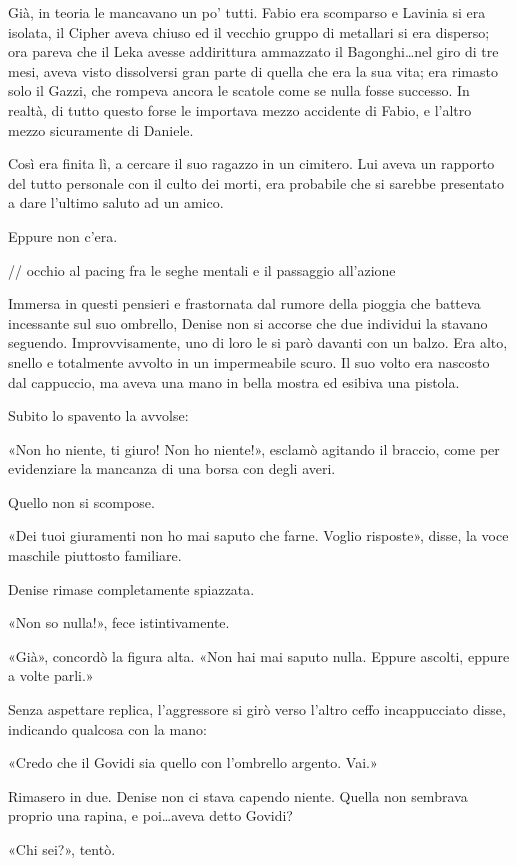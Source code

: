 Già, in teoria le mancavano un po' tutti. Fabio era scomparso e Lavinia si era isolata, il Cipher aveva chiuso ed il vecchio gruppo di metallari si era disperso; ora pareva che il Leka avesse addirittura ammazzato il Bagonghi\ldots nel giro di tre mesi, aveva visto dissolversi gran parte di quella che era la sua vita; era rimasto solo il Gazzi, che rompeva ancora le scatole come se nulla fosse successo. In realtà, di tutto questo forse le importava mezzo accidente di Fabio, e l'altro mezzo sicuramente di Daniele.

Così era finita lì, a cercare il suo ragazzo in un cimitero. Lui aveva un rapporto del tutto personale con il culto dei morti, era probabile che si sarebbe presentato a dare l'ultimo saluto ad un amico.

Eppure non c'era.

// occhio al pacing fra le seghe mentali e il passaggio all'azione

Immersa in questi pensieri e frastornata dal rumore della pioggia che batteva incessante sul suo ombrello, Denise non si accorse che due individui la stavano seguendo. Improvvisamente, uno di loro le si parò davanti con un balzo. Era alto, snello e totalmente avvolto in un impermeabile scuro. Il suo volto era nascosto dal cappuccio, ma aveva una mano in bella mostra ed esibiva una pistola.

Subito lo spavento la avvolse:

«Non ho niente, ti giuro! Non ho niente!», esclamò agitando il braccio, come per evidenziare la mancanza di una borsa con degli averi.

Quello non si scompose.

«Dei tuoi giuramenti non ho mai saputo che farne. Voglio risposte», disse, la voce maschile piuttosto familiare.

Denise rimase completamente spiazzata.

«Non so nulla!», fece istintivamente.

«Già», concordò la figura alta. «Non hai mai saputo nulla. Eppure ascolti, eppure a volte parli.»

Senza aspettare replica, l'aggressore si girò verso l'altro ceffo incappucciato disse, indicando qualcosa con la mano:

«Credo che il Govidi sia quello con l'ombrello argento. Vai.»

Rimasero in due. Denise non ci stava capendo niente. Quella non sembrava proprio una rapina, e poi\ldots aveva detto Govidi?

«Chi sei?», tentò.

